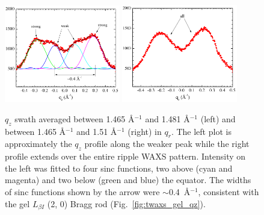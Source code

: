 \begin{figure}[htbp]
  \centering
  \includegraphics[width=0.45\textwidth]{figures/ripple/tWAXS/twaxs_weak_qz}
  \includegraphics[width=0.45\textwidth]{figures/ripple/tWAXS/twaxs_both_qz}
  \caption{$q_z$ swath averaged between 1.465 \AA$^{-1}$ and 1.481 \AA$^{-1}$
  (left) and between 1.465 \AA$^{-1}$ and 1.51 \AA$^{-1}$ (right) in $q_r$.
  The left plot is approximately the $q_z$ profile along the weaker peak
  while the right profile extends over the entire ripple WAXS pattern.
  Intensity on the left was fitted to four sinc functions, two above
  (cyan and magenta) and two below (green and blue) the equator.
  The widths of sinc functions shown by the arrow were $\sim$0.4~\AA$^{-1}$,
  consistent with the gel $L_{\beta I}$ (2, 0) Bragg rod 
  (Fig.~\ref{fig:twaxs_gel_qz}).}
  \label{fig:twaxs_qzplot}
\end{figure}  


